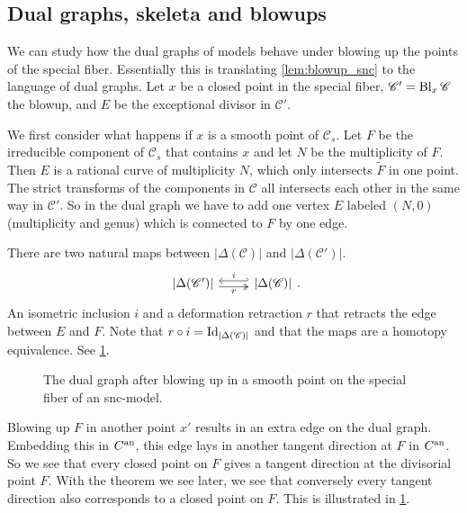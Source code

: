 \subsection{Dual graphs, skeleta and blowups} \label{sec:dual_graphs_and_blowups}
We can study how the dual graphs of models behave under blowing up the points of the special fiber.
Essentially this is translating \cref{lem:blowup_snc} to the language of dual graphs.
Let $x$ be a closed point in the special fiber, $\mathscr C' = \operatorname{Bl}_{x} \mathscr C$ the blowup, and $E$ be the exceptional divisor in $\mathscr C'$.

We first consider what happens if $x $ is a smooth point of $\mathscr C_s$. 
Let $F$ be the irreducible component of $\mathscr C_s$ that contains $x$ and let $N$ be the multiplicity of $F$. 
Then $E$ is a rational curve of multiplicity $N$, which only intersects $\tilde F$ in one point. 
The strict transforms of the components in $\mathscr C$ all intersects each other in the same way in $\mathscr C'$. 
So in the dual graph we have to add one vertex $E$ labeled $(N, 0)$ (multiplicity and genus) which is connected to $F$ by one edge.

There are two natural maps between $|\Delta(\mathscr C)|$ and $|\Delta(\mathscr C')|$. 
\[
\begin{tikzcd}
	{|\Delta(\mathscr C')|} \rar[hookleftarrow, shift left]{i} \rar[twoheadrightarrow, shift right, ']{r} & {|\Delta(\mathscr C)|} 
\end{tikzcd}
.\] 
An isometric inclusion $i$ and a deformation retraction $r$ that retracts the edge between  $E$ and $F$. 
Note that $r \circ i = \operatorname{Id}_{|\Delta(\mathscr C)|}$ and that the maps are a homotopy equivalence. 
See \cref{fig:blowup_smooth_point_skeleton}. 

\begin{figure}[ht]
    \centering
    \caption{The dual graph after blowing up in a smooth point on the special fiber of an snc-model. }
    \label{fig:blowup_smooth_point_skeleton}
\end{figure}

\begin{remark}
	Blowing up $ F$ in another point $x'$ results in an extra edge on the dual graph. 
	Embedding this in $C{}^{\text{an}}$, this edge lays in another tangent direction at $F$ in $C{}^{\text{an}}$. 
	So we see that every closed point  on  $F$ gives a tangent direction at the divisorial point $F$. 
	With the theorem we see later, we see that conversely every tangent direction also corresponds to a closed point on $F$. 
	This is illustrated in \cref{fig:blowup_smooth_point_skeleton}.
\end{remark}


